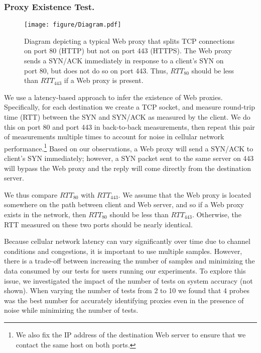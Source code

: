 \vspace{-1em}
\subsubsection{Proxy Existence Test.}

\begin{figure}[tb]
\centering
\texttt{[image: figure/Diagram.pdf]}
\caption{{Diagram depicting a typical Web proxy that splits TCP connections on port 80 (HTTP) but not on port 443 (HTTPS). The Web proxy sends a SYN/ACK immediately in response to a client's SYN on port 80, but does not do so on port 443. Thus, $RTT_{80}$ should be less than $RTT_{443}$ if a Web proxy is present. }} 
\vspace{\postfigspace}

\label{fig:Proxy Detection.}
\end{figure}
We use a latency-based approach to infer the existence of Web proxies. Specifically, for each destination we create a TCP socket, and measure round-trip time (RTT) between the SYN and SYN/ACK as measured by the client. We do this on port 80 and port 443 in back-to-back measurements, then repeat this pair of measurements multiple times to account for noise in cellular network performance.\footnote{We also fix the IP address of the destination Web server to ensure that we contact the same host on both ports.} Based on our observations, a Web proxy will send a SYN/ACK to client's SYN immediately; however, a SYN packet sent to the same server on 443 will bypass the Web proxy and the reply will come directly from the destination server. 

We thus compare $RTT_{80}$ with $RTT_{443}$. We assume that the Web proxy is located somewhere on the path between client and Web server, and so if a Web proxy exists in the network, then $RTT_{80}$ should be less than $RTT_{443}$. Otherwise, the RTT measured on these two ports should be nearly identical.  

Because cellular network latency can vary significantly over time due to channel conditions and congestions, it is important to use multiple samples. However, there is a trade-off between increasing the number of samples and minimizing the data consumed by our tests for users running our experiments. To explore this issue, we investigated the impact of the number of tests on system accuracy (not shown). When varying the number of tests from 2 to 10 we found that 4 probes was the best number for accurately identifying proxies even in the presence of noise while minimizing the number of tests.

